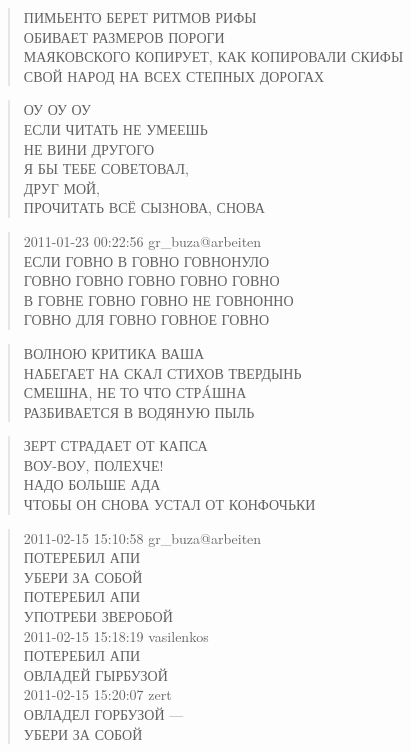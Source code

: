 \poemtitle{***}
\begin{verse}
ПИМЬЕНТО БЕРЕТ РИТМОВ РИФЫ\\
ОБИВАЕТ РАЗМЕРОВ ПОРОГИ\\
МАЯКОВСКОГО КОПИРУЕТ, КАК КОПИРОВАЛИ СКИФЫ\\
СВОЙ НАРОД НА ВСЕХ СТЕПНЫХ ДОРОГАХ
\end{verse}

\poemtitle{***}
\begin{verse}
ОУ ОУ ОУ\\
ЕСЛИ ЧИТАТЬ НЕ УМЕЕШЬ\\
НЕ ВИНИ ДРУГОГО\\
Я БЫ ТЕБЕ СОВЕТОВАЛ,\\
ДРУГ МОЙ,\\
ПРОЧИТАТЬ ВСЁ СЫЗНОВА, СНОВА
\end{verse}

\poemtitle{***}
\begin{verse}
2011-01-23 00:22:56 gr\_buza@arbeiten\\
ЕСЛИ ГОВНО В ГОВНО ГОВНОНУЛО\\
ГОВНО ГОВНО ГОВНО ГОВНО ГОВНО\\
В ГОВНЕ ГОВНО ГОВНО НЕ ГОВНОННО\\
ГОВНО ДЛЯ ГОВНО ГОВНОЕ ГОВНО
\end{verse}

\poemtitle{***}
\begin{verse}
ВОЛНОЮ КРИТИКА ВАША\\
НАБЕГАЕТ НА СКАЛ СТИХОВ ТВЕРДЫНЬ\\
СМЕШНА, НЕ ТО ЧТО СТРÁШНА\\
РАЗБИВАЕТСЯ В ВОДЯНУЮ ПЫЛЬ
\end{verse}

\poemtitle{***}
\begin{verse}
ЗЕРТ СТРАДАЕТ ОТ КАПСА\\
ВОУ-ВОУ, ПОЛЕХЧЕ!\\
НАДО БОЛЬШЕ АДА\\
ЧТОБЫ ОН СНОВА УСТАЛ ОТ КОНФОЧЬКИ
\end{verse}

\poemtitle{***}
\begin{verse}
2011-02-15 15:10:58 gr\_buza@arbeiten\\
ПОТЕРЕБИЛ АПИ\\
УБЕРИ ЗА СОБОЙ\\
ПОТЕРЕБИЛ АПИ\\
УПОТРЕБИ ЗВЕРОБОЙ\\
2011-02-15 15:18:19 vasilenkos\\
ПОТЕРЕБИЛ АПИ\\
ОВЛАДЕЙ ГЫРБУЗОЙ\\
2011-02-15 15:20:07 zert\\
ОВЛАДЕЛ ГОРБУЗОЙ —\\
УБЕРИ ЗА СОБОЙ
\end{verse}

